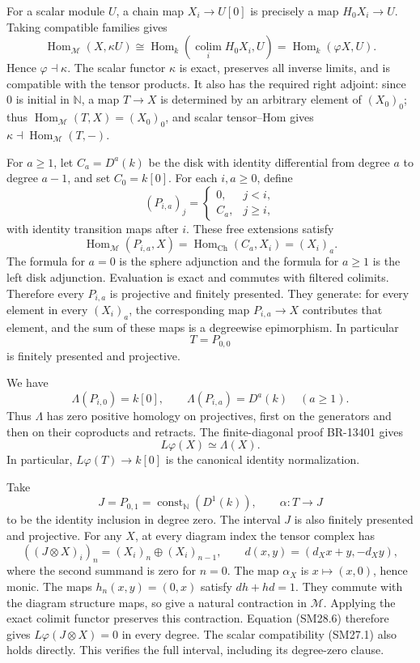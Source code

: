 For a scalar module \(U\), a chain map \(X_i\to U[0]\) is precisely
a map \(H_0X_i\to U\).  Taking compatible families gives
\[
 \operatorname{Hom}_{\mathcal M}(X,\kappa U)
   \cong\operatorname{Hom}_k
       \left(\operatorname*{colim}_{i}H_0X_i,U\right)
   =\operatorname{Hom}_k(\varphi X,U).
 \tag{SM28.3}
\]
Hence \(\varphi\dashv\kappa\).
The scalar functor \(\kappa\) is exact, preserves all inverse limits,
and is compatible with the tensor products.  It also has the required
right adjoint: since \(0\) is initial in \(\mathbb N\), a map
\(T\to X\) is determined by an arbitrary element of \((X_0)_0\);
thus \(\operatorname{Hom}_{\mathcal M}(T,X)=(X_0)_0\), and
scalar tensor--Hom gives \(\kappa\dashv\operatorname{Hom}_{\mathcal M}(T,-)\).

For \(a\ge1\), let \(C_a=D^a(k)\) be the disk with identity
differential from degree \(a\) to degree \(a-1\), and set
\(C_0=k[0]\).  For each \(i,a\ge0\), define
\[
 (P_{i,a})_j=
 \begin{cases}0,&j<i,\\ C_a,&j\ge i,\end{cases}
 \tag{SM28.4}
\]
with identity transition maps after \(i\).  These free extensions
satisfy
\[
 \operatorname{Hom}_{\mathcal M}(P_{i,a},X)
   =\operatorname{Hom}_{\mathrm{Ch}}(C_a,X_i)
   =(X_i)_a.
 \tag{SM28.5}
\]
The formula for \(a=0\) is the sphere adjunction and the formula for
\(a\ge1\) is the left disk adjunction.  Evaluation is exact and
commutes with filtered colimits.  Therefore every \(P_{i,a}\) is
projective and finitely presented.  They generate: for every element
in every \((X_i)_a\), the corresponding map \(P_{i,a}\to X\) contributes
that element, and the sum of these maps is a degreewise epimorphism.
In particular
\[
 T=P_{0,0}
\]
is finitely presented and projective.

We have
\[
 \Lambda(P_{i,0})=k[0],\qquad
 \Lambda(P_{i,a})=D^a(k)\quad(a\ge1).
\]
Thus \(\Lambda\) has zero positive homology on projectives, first on
the generators and then on their coproducts and retracts.
The finite-diagonal proof BR-13401 gives
\[
 L\varphi(X)\simeq\Lambda(X).
 \tag{SM28.6}
\]
In particular, \(L\varphi(T)\to k[0]\) is the canonical identity
normalization.

Take
\[
 J=P_{0,1}=\operatorname{const}_{\mathbb N}(D^1(k)),
 \qquad
 \alpha:T\longrightarrow J
\]
to be the identity inclusion in degree zero.  The interval \(J\)
is also finitely presented and projective.
For any \(X\), at every diagram index the tensor complex has
\[
 ((J\otimes X)_i)_n=(X_i)_n\oplus(X_i)_{n-1},\qquad
 d(x,y)=(d_Xx+y,-d_Xy),
 \tag{SM28.7}
\]
where the second summand is zero for \(n=0\).
The map \(\alpha_X\) is \(x\mapsto(x,0)\), hence monic.
The maps \(h_n(x,y)=(0,x)\) satisfy \(dh+hd=1\).
They commute with the diagram structure maps, so give a natural
contraction in \(\mathcal M\).  Applying the exact colimit functor
preserves this contraction.  Equation (SM28.6) therefore gives
\(L\varphi(J\otimes X)=0\) in every degree.
The scalar compatibility (SM27.1) also holds directly.
This verifies the full interval, including its degree-zero clause.

